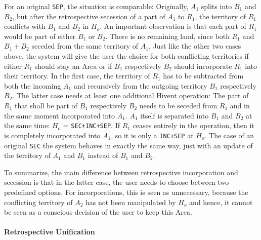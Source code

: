 For an original \texttt{SEP}, the situation is comparable: Originally, $A_1$ splits into $B_1$ and $B_2$, but after the retrospective secession of a part of $A_1$ to $R_1$, the territory of $R_1$ conflicts with $B_1$ and $B_2$ in $H_o$. An important observation is that each part of $R_1$ would be part of either $B_1$ or $B_2$. There is no remaining land, since both $R_1$ and $B_1+B_2$ seceded from the same territory of $A_1$. Just like the other two cases above, the system will give the user the choice for both conflicting territories if either $R_1$ should stay an Area or if $B_1$ respectively $B_2$ should incorporate $R_1$ into their territory. In the first case, the territory of $R_1$ has to be subtracted from both the incoming $A_1$ and recursively from the outgoing territory $B_1$ respectively $B_2$. The latter case needs at least one additional Hivent operation: The part of $R_1$ that shall be part of $B_1$ respectively $B_2$ needs to be seceded from $R_1$ and in the same moment incorporated into $A_1$. $A_1$ itself is separated into $B_1$ and $B_2$ at the same time: $H_o$ = \texttt{SEC+INC+SEP}. If $R_1$ ceases entirely in the operation, then it is completely incorporated into $A_1$, so it is only a \texttt{INC+SEP} at $H_o$. The case of an original \texttt{SEC} the system behaves in exactly the same way, just with an update of the territory of $A_1$ and $B_1$ instead of $B_1$ and $B_2$.

To summarize, the main difference between retrospective incorporation and secession is that in the latter case, the user needs to choose between two predefined options. For incorporations, this is seen as unnecessary, because the conflicting territory of $A_2$ has not been manipulated by $H_o$ and hence, it cannot be seen as a conscious decision of the user to keep this Area.


\paragraph{Retrospective Unification} %
\label{par:retrospective_unification}

